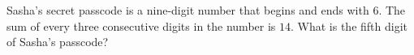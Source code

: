 Sasha's secret passcode is a nine-digit number that begins and ends with $6$. The sum of every three consecutive digits in the number is $14$. What is the fifth digit of Sasha's passcode?

